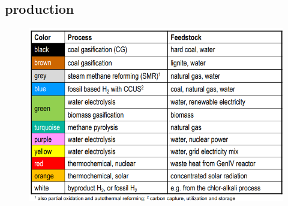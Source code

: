 \documentclass[a4paper,10pt,landscape]{scrartcl}
\begin{document}
\begin{multicols*}{3}
\subsection{production}
\vspace{-.5cm}
\begin{figure}[H]
    \centering
    \includegraphics[width=1\linewidth]{src/H2_colors.png}
\end{figure}

\end{multicols*}
\end{document}
